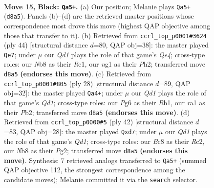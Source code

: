 \documentclass[11pt]{article}
\begin{document}
\clearpage

\begin{figure}[p]\centering
\begin{subfigure}{0.46\textwidth}\centering
\resizebox{\linewidth}{!}{%
\newchessgame
\chessboard[
  setfen={rnbqk2b/pp6/6p1/6P1/3pP3/8/P7/R1BQKBN1 b Qq - 0 15},
  showmover=false,
  pgfstyle=straightmove, color=movearrow, markmove={d8-a5}
]}
\caption{}
\end{subfigure}\hfill
\begin{subfigure}{0.46\textwidth}\centering
\resizebox{\linewidth}{!}{%
\newchessgame
\chessboard[
  setfen={2rq2k1/3b1ppp/p7/1p1B4/4QP2/P7/1P4PP/4R1K1 w - - 4 23},
  showmover=false,
  pgfstyle=straightmove, color=movearrow, markmove={e4-e7}
]}
\caption{}
\end{subfigure}
\\[4pt]
\begin{subfigure}{0.46\textwidth}\centering
\resizebox{\linewidth}{!}{%
\newchessgame
\chessboard[
  setfen={3qkb1r/2p2ppp/4p3/4P3/1nBP4/2N1B3/1P3PbP/3QK2R w Kk - 0 15},
  showmover=false,
  pgfstyle=straightmove, color=movearrow, markmove={d1-a4}
]}
\caption{}
\end{subfigure}\hfill
\begin{subfigure}{0.46\textwidth}\centering
\resizebox{\linewidth}{!}{%
\newchessgame
\chessboard[
  setfen={q5k1/3p1ppp/4p3/1r6/1b2P3/4BP2/1PR3PP/3Q2K1 w - - 0 22},
  showmover=false,
  pgfstyle=straightmove, color=movearrow, markmove={d1-d7}
]}
\caption{}
\end{subfigure}
\caption{\textbf{Move 15, Black: \texttt{Qa5+}.} (a) Our position; Melanie plays \texttt{Qa5+} (\texttt{d8a5}). Panels (b)--(d) are the retrieved master positions whose correspondence most drove this move (highest QAP objective among those that transfer to it). (b) Retrieved from \texttt{ccrl\_top\_p0001\#3624} (ply 44) [structural distance $d$=80, QAP obj=38]: the master played \texttt{Qe7}; under $\mu$ our \emph{Qd1} plays the role of that game's \emph{Qe4}; cross-type roles: our \emph{N}b8 as their \emph{R}e1, our \emph{n}g1 as their \emph{P}h2; transferred move \texttt{d8a5} \textbf{(endorses this move)}. (c) Retrieved from \texttt{ccrl\_top\_p0001\#805} (ply 28) [structural distance $d$=89, QAP obj=32]: the master played \texttt{Qa4+}; under $\mu$ our \emph{Qd1} plays the role of that game's \emph{Qd1}; cross-type roles: our \emph{P}g6 as their \emph{R}h1, our \emph{r}a1 as their \emph{P}b2; transferred move \texttt{d8a5} \textbf{(endorses this move)}. (d) Retrieved from \texttt{ccrl\_top\_p0000\#5} (ply 42) [structural distance $d$=83, QAP obj=28]: the master played \texttt{Qxd7}; under $\mu$ our \emph{Qd1} plays the role of that game's \emph{Qd1}; cross-type roles: our \emph{B}c8 as their \emph{R}c2, our \emph{N}b8 as their \emph{P}g2; transferred move \texttt{d8a5} \textbf{(endorses this move)}. Synthesis: 7 retrieved analogs transferred to \texttt{Qa5+} (summed QAP objective 112, the strongest correspondence among the candidate moves); Melanie committed it via the \texttt{search} selector.}
\label{fig:thought-m29}
\end{figure}
\end{document}
